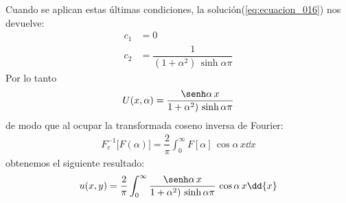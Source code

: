 Cuando se aplican estas últimas condiciones, la solución(\ref{eq:ecuacion_016}) nos devuelve:
\begin{align*}
c_{1} &= 0 \\[0.5em]
c_{2} &= \dfrac{1}{(1 + \alpha^{2}) \, \sinh \alpha \pi}
\end{align*}
Por lo tanto
\begin{align*}
U(x, \alpha) = \dfrac{\senh \alpha \, x}{1 + \alpha^{2}) \, \sinh \alpha \pi}
\end{align*}
de modo que al ocupar la transformada coseno inversa de Fourier:
\begin{align*}
F_{c}^{-1} \big[F(\alpha)\big] = \dfrac{2}{\pi} \int_{0}^{\infty} F[\alpha] \, \cos \alpha \, x \dd{x}
\end{align*}
obtenemos el siguiente resultado:
\begin{align*}
u(x, y) = \dfrac{2}{\pi} \int_{0}^{\infty}  \dfrac{\senh \alpha \, x}{1 + \alpha^{2}) \, \sinh \alpha \pi} \, \cos \alpha \, x \dd{x}
\end{align*}



